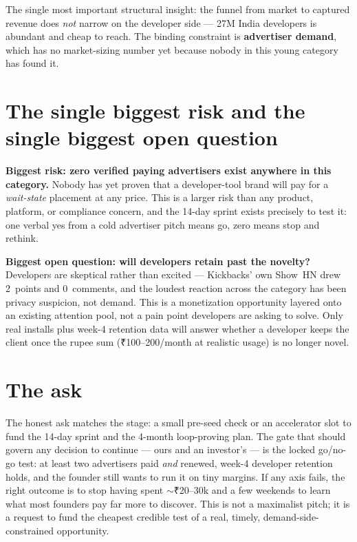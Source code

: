 The single most important structural insight: the funnel from market to
captured revenue does \emph{not} narrow on the developer side --- 27M India
developers is abundant and cheap to reach. The binding constraint is
\textbf{advertiser demand}, which has no market-sizing number yet because
nobody in this young category has found it.

\section{The single biggest risk and the single biggest open question}

\textbf{Biggest risk: zero verified paying advertisers exist anywhere in this
category.} Nobody has yet proven that a developer-tool brand will pay for a
\emph{wait-state} placement at any price. This is a larger risk than any
product, platform, or compliance concern, and the 14-day sprint exists
precisely to test it: one verbal yes from a cold advertiser pitch means go,
zero means stop and rethink.

\textbf{Biggest open question: will developers retain past the novelty?}
Developers are skeptical rather than excited --- Kickbacks' own Show~HN drew
2~points and 0~comments, and the loudest reaction across the category has been
privacy suspicion, not demand. This is a monetization opportunity layered onto
an existing attention pool, not a pain point developers are asking to solve.
Only real installs plus week-4 retention data will answer whether a developer
keeps the client once the rupee sum (₹100--200/month at realistic usage)
is no longer novel.

\section{The ask}

The honest ask matches the stage: a small pre-seed check or an accelerator
slot to fund the 14-day sprint and the 4-month loop-proving plan. The gate that
should govern any decision to continue --- ours and an investor's --- is the
locked go/no-go test: at least two advertisers paid \emph{and} renewed,
week-4 developer retention holds, and the founder still wants to run it on tiny
margins. If any axis fails, the right outcome is to stop having spent
$\sim$₹20--30k and a few weekends to learn what most founders pay far more
to discover. This is not a maximalist pitch; it is a request to fund the
cheapest credible test of a real, timely, demand-side-constrained opportunity.

